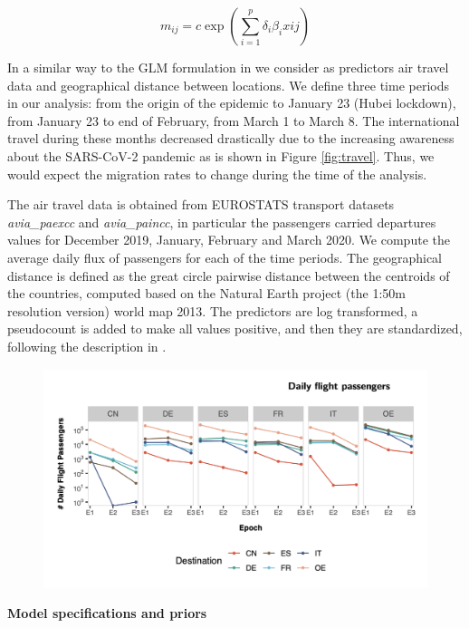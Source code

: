 \begin{equation}
m_{ij} = c \exp(\sum_{i = 1}^p \delta_i \beta_i xij)
\label{eq:glm}
\end{equation}

In a similar way to the GLM formulation in \cite{Lemey2020} we consider as predictors air travel data and geographical distance between locations. We define three time periods in our analysis: from the origin of the epidemic to January 23 (Hubei lockdown), from January 23 to end of February, from March 1 to March 8. The international travel during these months decreased drastically due to the increasing awareness about the SARS-CoV-2 pandemic as is shown in Figure \ref{fig:travel}. Thus, we would expect the migration rates to change during the time of the analysis. 

The air travel data is obtained from EUROSTATS transport datasets \textit{avia\_paexcc} and \textit{avia\_paincc}, in particular the passengers carried departures values for December 2019, January, February and March 2020. We compute the average daily flux of passengers for each of the time periods. The geographical distance is defined as the great circle pairwise distance between the centroids of the countries, computed based on the Natural Earth project (the 1:50m resolution version) world map 2013. The predictors are log transformed, a pseudocount is added to make all values positive, and then they are standardized, following the description in \cite{Lemey2014}.

\begin{figure}[h]
    \centering
    \includegraphics[width=\textwidth]{figures/flight_data.png}
    \caption{}
    \label{fig:epitrajs}
\end{figure}

\textbf{Model specifications and priors}

